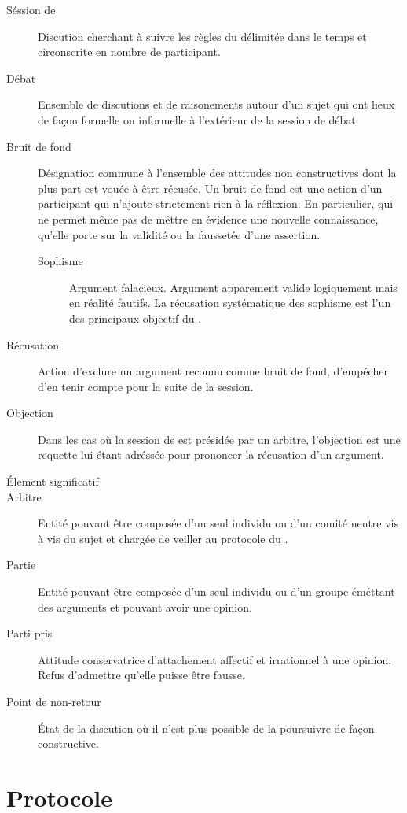 \begin{description}
  \item[Séssion de \mainabbr{}] Discution cherchant à suivre les règles du \mainabbr{} délimitée dans le temps et circonscrite en nombre de participant.
  \item[Débat] Ensemble de discutions et de raisonements autour d’un sujet qui ont lieux de façon formelle ou informelle à l’extérieur de la session de débat.
  \item[Bruit de fond] Désignation commune à l’ensemble des attitudes non constructives dont la plus part est vouée à être récusée. Un bruit de fond est une action d’un participant qui n’ajoute strictement rien à la réflexion. En particulier, qui ne permet même pas de mêttre en évidence une nouvelle connaissance, qu’elle porte sur la validité ou la faussetée d’une assertion.

    \begin{description}
      \item[Sophisme] Argument falacieux. Argument apparement valide logiquement mais en réalité fautifs. La récusation systématique des sophisme est l’un des principaux objectif du \mainabbr{}.
    \end{description}

  \item[Récusation] Action d’exclure un argument reconnu comme bruit de fond, d’empécher d’en tenir compte pour la suite de la session.
  \item[Objection] Dans les cas où la session de \mainabbr{} est présidée par un arbitre, l’objection est une requette lui étant adréssée pour prononcer la récusation d’un argument.
  \item[Élement significatif] 
  \item[Arbitre] Entité pouvant être composée d’un seul individu ou d’un comité neutre vis à vis du sujet et chargée de veiller au protocole du \mainabbr{}.
  \item[Partie] Entité pouvant être composée d’un seul individu ou d’un groupe éméttant des arguments et pouvant avoir une opinion.
  \item[Parti pris] Attitude conservatrice d’attachement affectif et irrationnel à une opinion. Refus d’admettre qu’elle puisse être fausse.
  \item[Point de non-retour] État de la discution où il n’est plus possible de la poursuivre de façon constructive.
\end{description}

\section{Protocole}
